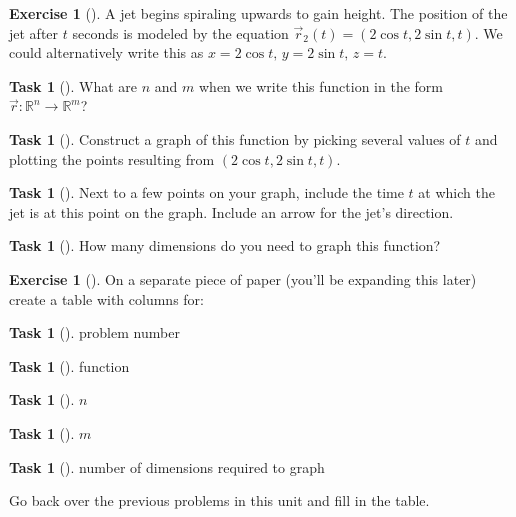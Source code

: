 \documentclass[10pt,]{book}
\theoremstyle{plain}
\theoremstyle{definition}
\theoremstyle{definition}
\theoremstyle{definition}
\theoremstyle{definition}
\newtheorem{exploration}[project]{Exercise}
\newtheorem{task}[project]{Task}
\theoremstyle{definition}
\numberwithin{equation}{section}
\begin{document}
\begin{exploration}[]\label{prob_jet_intro_for_space_curves}
A jet begins spiraling upwards to gain height. The position of the jet after \(t\) seconds is modeled by the equation \(\vec r_2(t)=(2\cos t, 2\sin t, t).\) We could alternatively write this as \(x=2\cos t,\, y=2\sin t,\, z=t\).%
\begin{task}[]\label{task-174}
What are \(n\) and \(m\) when we write this function in the form  \(\vec r\colon {\mathbb{R}}^n\to {\mathbb{R}}^m\)?%
\end{task}
\begin{task}[]\label{task-175}
Construct a graph of this function by picking several values of \(t\) and plotting the points resulting from \((2\cos t, 2\sin t, t)\).%
\end{task}
\begin{task}[]\label{task-176}
Next to a few points on your graph, include the time \(t\) at which the jet is at this point on the graph. Include an arrow for the jet's direction.%
\end{task}
\begin{task}[]\label{task-177}
How many dimensions do you need to graph this function?%
\end{task}
\end{exploration}
\begin{exploration}[]\label{prob_function_table}
On a separate piece of paper (you'll be expanding this later) create a table with columns for: \leavevmode%
\begin{itemize}[label=\textbullet]
\begin{task}[]\label{task-178}
problem number%
\end{task}
\begin{task}[]\label{task-179}
function%
\end{task}
\begin{task}[]\label{task-180}
\(n\)%
\end{task}
\begin{task}[]\label{task-181}
\(m\)%
\end{task}
\begin{task}[]\label{task-182}
number of dimensions required to graph%
\end{task}
\end{itemize}
%
\par
Go back over the previous problems in this unit and fill in the table.%
\end{exploration}
\typeout{************************************************}
\typeout{************************************************}
\end{document}
